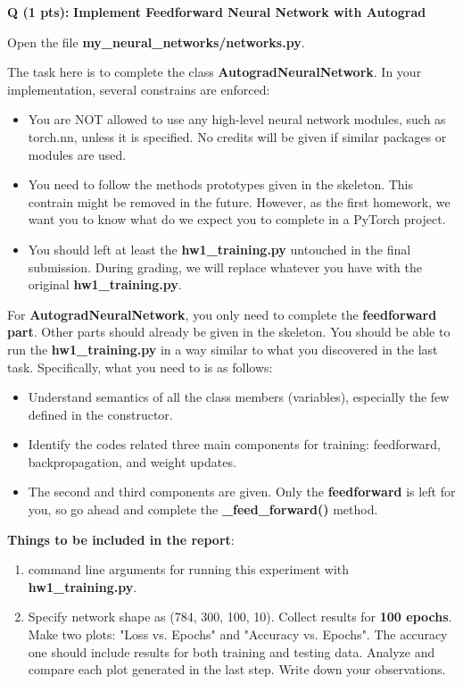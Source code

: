 \documentclass{article}
\newcommand{\homeworknumber}{1}
\newcounter{questionno}
\newcounter{partno}
\newcommand{\question}[1]{
\noindent
\newline
\stepcounter{questionno}
\setcounter{partno}{0}
{\bf Q\arabic{questionno} (#1 pts): }
}
\begin{document}
\question{1}{\bf Implement Feedforward Neural Network with Autograd}

\noindent Open the file \textbf{my\_neural\_networks/networks.py}.

\hfill

\noindent The task here is to complete the class \textbf{AutogradNeuralNetwork}. In your implementation, several constrains are enforced:
\begin{itemize}
  \item You are NOT allowed to use any high-level neural network modules,
    such as torch.nn, unless it is specified. No credits will be given if
    similar packages or modules are used.
  \item You need to follow the methods prototypes given in the skeleton. This
    contrain might be removed in the future. However, as the first homework,
    we want you to know what do we expect you to complete in a PyTorch project.
  \item You should left at least the \textbf{hw\homeworknumber\_training.py} untouched in the final submission.
  During grading, we will replace whatever you have with the original \textbf{hw\homeworknumber\_training.py}.
\end{itemize}

\noindent For \textbf{AutogradNeuralNetwork}, you only need to complete the \textbf{feedforward part}. Other parts should already be given in the skeleton. You should be able to run the \textbf{hw\homeworknumber\_training.py} in a way similar to what you discovered in the last task. Specifically, what you need to is as follows:

\begin{itemize}
  \item Understand semantics of all the class members (variables), especially the few defined in the constructor.
  \item Identify the codes related three main components for training: feedforward, backpropagation, and weight updates.
  \item The second and third components are given. Only the \textbf{feedforward} is left for you, so go ahead and complete the \textbf{\_feed\_forward()} method.
\end{itemize}

\noindent \textbf{Things to be included in the report}:
\begin{enumerate}
  \item command line arguments for running this experiment with \textbf{hw\homeworknumber\_training.py}.
  \item Specify network shape as (784, 300, 100, 10). Collect results for \textbf{100 epochs}.
        Make two plots: "Loss vs. Epochs" and "Accuracy vs. Epochs". The
        accuracy one should include results for both training and
        testing data. Analyze and compare each plot generated in the last step. Write down your observations.
\end{enumerate}
\end{document}
